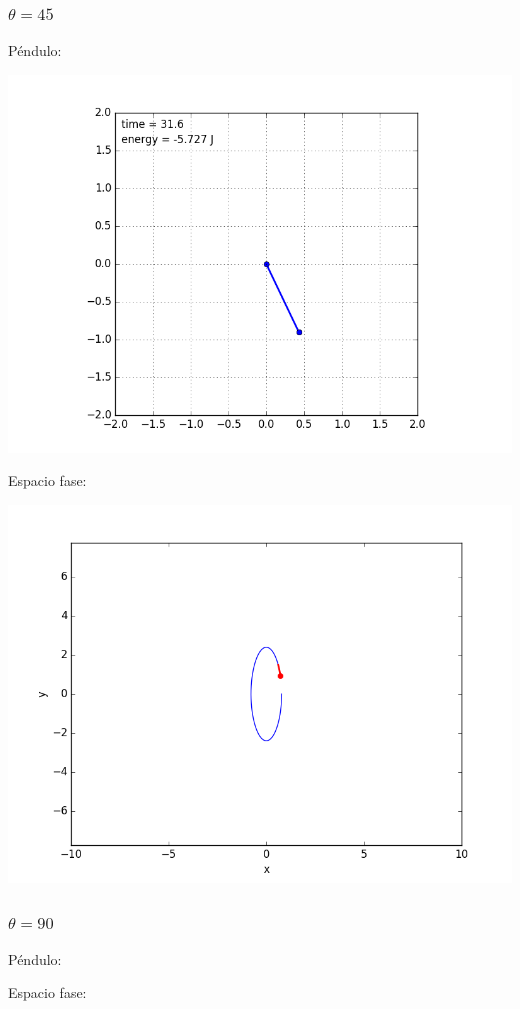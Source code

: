 \documentclass[12pt,letterpaper]{article}
\begin{document}
\subsubsection*{$\theta = 45$}
Péndulo:
\begin{center}
\includegraphics[scale=0.3]{451.png}
\end{center}
Espacio fase:
\begin{center}
\includegraphics[scale=0.3]{45.png}
\end{center}

\subsubsection*{$\theta = 90$}
Péndulo:
\begin{center}
\end{center}
Espacio fase:
\begin{center}
\end{center}
\end{document}
